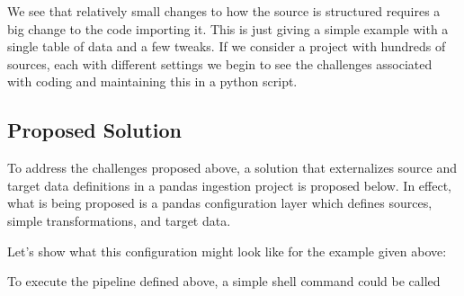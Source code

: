 We see that relatively small changes to how the source is structured
requires a big change to the code importing it. This is just giving a
simple example with a single table of data and a few tweaks. If we
consider a project with hundreds of sources, each with different
settings we begin to see the challenges associated with coding and
maintaining this in a python script.

\subsection{Proposed Solution}\label{proposed-solution}

To address the challenges proposed above, a solution that externalizes
source and target data definitions in a pandas ingestion project is
proposed below. In effect, what is being proposed is a pandas
configuration layer which defines sources, simple transformations, and
target data.

Let's show what this configuration might look like for the example given
above:

\begin{Shaded}
\begin{Highlighting}[]
\KeywordTok{:}
\AttributeTok{  }\KeywordTok{:}
\AttributeTok{  }\KeywordTok{:}
\AttributeTok{  }\KeywordTok{:}
\AttributeTok{  }\KeywordTok{:}
\KeywordTok{:}
\AttributeTok{  }\KeywordTok{:}
\AttributeTok{  }\KeywordTok{:}
\AttributeTok{  }\KeywordTok{:}
\KeywordTok{:}
\AttributeTok{  }\KeywordTok{:}
\end{Highlighting}
\end{Shaded}

To execute the pipeline defined above, a simple shell command could be
called

\begin{Shaded}
\begin{Highlighting}[]
 
\end{Highlighting}
\end{Shaded}
